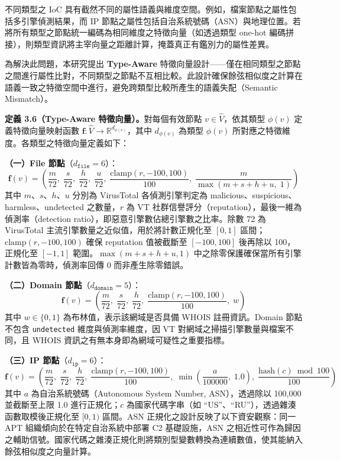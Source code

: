 \begin{ZhChapter}
不同類型之 IoC 具有截然不同的屬性語義與維度空間。例如，檔案節點之屬性包括多引擎偵測結果，而 IP 節點之屬性包括自治系統號碼（ASN）與地理位置。若將所有類型之節點統一編碼為相同維度之特徵向量（如透過類型 one-hot 編碼拼接），則類型資訊將主宰向量之距離計算，掩蓋真正有鑑別力的屬性差異。

為解決此問題，本研究提出 \textbf{Type-Aware} 特徵向量設計——僅在相同類型之節點之間進行屬性比對，不同類型之節點不互相比較。此設計確保餘弦相似度之計算在語義一致之特徵空間中進行，避免跨類型比較所產生的語義失配（Semantic Mismatch）。

\noindent\textbf{定義 3.6（Type-Aware 特徵向量）。}對每個有效節點 $v \in \hat{V}$，依其類型 $\phi(v)$ 定義特徵向量映射函數 $\mathbf{f}: \hat{V} \rightarrow \mathbb{R}^{d_{\phi(v)}}$，其中 $d_{\phi(v)}$ 為類型 $\phi(v)$ 所對應之特徵維度。各類型之特徵向量定義如下：

\textbf{（一）File 節點}（$d_{\texttt{file}} = 6$）：
\begin{equation}
    \mathbf{f}(v) = \left( \frac{m}{72},\; \frac{s}{72},\; \frac{h}{72},\; \frac{u}{72},\; \frac{\text{clamp}(r, -100, 100)}{100},\; \frac{m}{\max(m{+}s{+}h{+}u,\; 1)} \right)
    \label{eq:file-feature}
\end{equation}
其中 $m$、$s$、$h$、$u$ 分別為 VirusTotal 各偵測引擎判定為 malicious、suspicious、harmless、undetected 之數量，$r$ 為 VT 社群信譽評分（reputation），最後一維為偵測率（detection ratio），即惡意引擎數佔總引擎數之比率。除數 72 為 VirusTotal 主流引擎數量之近似值，用於將計數正規化至 $[0, 1]$ 區間；$\text{clamp}(r, -100, 100)$ 確保 reputation 值被截斷至 $[-100, 100]$ 後再除以 100，正規化至 $[-1, 1]$ 範圍。$\max(m{+}s{+}h{+}u, 1)$ 中之除零保護確保當所有引擎計數皆為零時，偵測率回傳 0 而非產生除零錯誤。

\textbf{（二）Domain 節點}（$d_{\texttt{domain}} = 5$）：
\begin{equation}
    \mathbf{f}(v) = \left( \frac{m}{72},\; \frac{s}{72},\; \frac{h}{72},\; \frac{\text{clamp}(r, -100, 100)}{100},\; w \right)
    \label{eq:domain-feature}
\end{equation}
其中 $w \in \{0, 1\}$ 為布林值，表示該網域是否具備 WHOIS 註冊資訊。Domain 節點不包含 \texttt{undetected} 維度與偵測率維度，因 VT 對網域之掃描引擎數量與檔案不同，且 WHOIS 資訊之有無本身即為網域可疑性之重要指標。

\textbf{（三）IP 節點}（$d_{\texttt{ip}} = 6$）：
\begin{equation}
    \mathbf{f}(v) = \left( \frac{m}{72},\; \frac{s}{72},\; \frac{h}{72},\; \frac{\text{clamp}(r, -100, 100)}{100},\; \min\!\left(\frac{a}{100000},\; 1.0\right),\; \frac{\text{hash}(c) \bmod 100}{100} \right)
    \label{eq:ip-feature}
\end{equation}
其中 $a$ 為自治系統號碼（Autonomous System Number, ASN），透過除以 100,000 並截斷至上限 1.0 進行正規化；$c$ 為國家代碼字串（如 ``US''、``RU''），透過雜湊函數取模後正規化至 $[0, 1)$ 區間。ASN 正規化之設計反映了以下資安觀察：同一 APT 組織傾向於在特定自治系統中部署 C2 基礎設施，ASN 之相近性可作為歸因之輔助信號。國家代碼之雜湊正規化則將類別型變數轉換為連續數值，使其能納入餘弦相似度之向量計算。


\end{ZhChapter}
